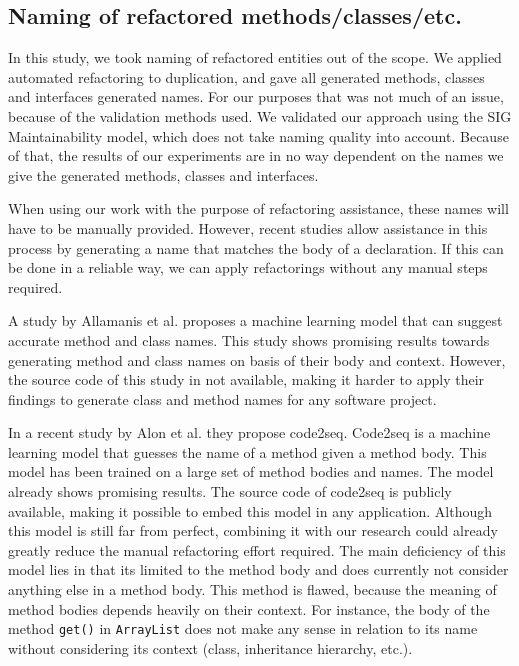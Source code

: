 \subsection{Naming of refactored methods/classes/etc.}
In this study, we took naming of refactored entities out of the scope. We applied automated refactoring to duplication, and gave all generated methods, classes and interfaces generated names. For our purposes that was not much of an issue, because of the validation methods used. We validated our approach using the SIG Maintainability model, which does not take naming quality into account. Because of that, the results of our experiments are in no way dependent on the names we give the generated methods, classes and interfaces.

When using our work with the purpose of refactoring assistance, these names will have to be manually provided. However, recent studies allow assistance in this process by generating a name that matches the body of a declaration. If this can be done in a reliable way, we can apply refactorings without any manual steps required.

A study by Allamanis et al. \cite{allamanis2015suggesting} proposes a machine learning model that can suggest accurate method and class names. This study shows promising results towards generating method and class names on basis of their body and context. However, the source code of this study in not available, making it harder to apply their findings to generate class and method names for any software project.

In a recent study by Alon et al. \cite{alon2018code2seq} they propose code2seq. Code2seq is a machine learning model that guesses the name of a method given a method body. This model has been trained on a large set of method bodies and names. The model already shows promising results. The source code of code2seq is publicly available, making it possible to embed this model in any application. Although this model is still far from perfect, combining it with our research could already greatly reduce the manual refactoring effort required. The main deficiency of this model lies in that its limited to the method body and does currently not consider anything else in a method body. This method is flawed, because the meaning of method bodies depends heavily on their context. For instance, the body of the method \texttt{get()} in \texttt{ArrayList} does not make any sense in relation to its name without considering its context (class, inheritance hierarchy, etc.).

